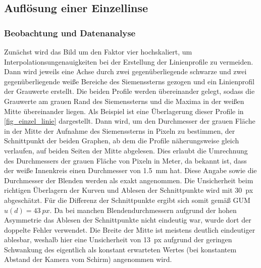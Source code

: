 \documentclass[
	a4paper,
	12pt,
	pagesize,
	ngerman
]{scrartcl}
\begin{document}
	\subsection{Auflösung einer Einzellinse} \label{ss_einzellinse}
	\subsubsection{Beobachtung und Datenanalyse}
	Zunächst wird das Bild um den Faktor vier hochskaliert, um Interpolationsungenauigkeiten bei der Erstellung der Linienprofile zu vermeiden.
	Dann wird jeweils eine Achse durch zwei gegenüberliegende schwarze und zwei gegenüberliegende weiße Bereiche des Siemenssterns gezogen und ein Linienprofil der Grauwerte erstellt.
	Die beiden Profile werden übereinander gelegt, sodass die Grauwerte am grauen Rand des Siemenssterns und die Maxima in der weißen Mitte  übereinander liegen.
	Als Beispiel ist eine Überlagerung dieser Profile in \cref{fig_einzel_linie} dargestellt.
	Dann wird, um den Durchmesser der grauen Fläche in der Mitte der Aufnahme des Siemenssterns in Pixeln zu bestimmen, der Schnittpunkt der beiden Graphen, ab dem die Profile näherungsweise gleich verlaufen, auf beiden Seiten der Mitte abgelesen.
	Dies erlaubt die Umrechnung des Durchmessers der grauen Fläche von Pixeln in Meter, da bekannt ist, dass der weiße Innenkreis einen Durchmesser von \SI{1,5}{mm} hat.
	Diese Angabe sowie die Durchmesser der Blenden werden als exakt angenommen.
	Die Unsicherheit beim richtigen Überlagern der Kurven und Ablesen der Schnittpunkte wird mit \SI{30}{px} abgeschätzt.
	Für die Differenz der Schnittpunkte ergibt sich somit gemäß GUM $u(d)= \SI{43}{px}$.
	Da bei manchen Blendendurchmessern aufgrund der hohen Asymmetrie das Ablesen der Schnittpunkte nicht eindeutig war, wurde dort der doppelte Fehler verwendet.
	Die Breite der Mitte ist meistens deutlich eindeutiger ablesbar, weshalb hier eine Unsicherheit von \SI{13}{px} aufgrund der geringen Schwankung des eigentlich als konstant erwarteten Wertes (bei konstantem Abstand der Kamera vom Schirm) angenommen wird.
	
\end{document}

